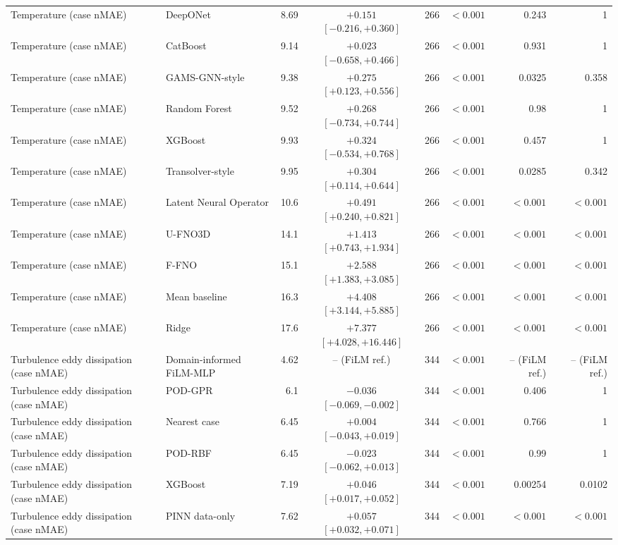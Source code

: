 \begin{landscape}
\begin{longtable}{p{4.0cm}p{3.4cm}rcrrrr}
Temperature (case nMAE) & DeepONet & 8.69 & $+0.151$ $[-0.216, +0.360]$ & 266 & $< 0.001$ & 0.243 & 1 \\
Temperature (case nMAE) & CatBoost & 9.14 & $+0.023$ $[-0.658, +0.466]$ & 266 & $< 0.001$ & 0.931 & 1 \\
Temperature (case nMAE) & GAMS-GNN-style & 9.38 & $+0.275$ $[+0.123, +0.556]$ & 266 & $< 0.001$ & 0.0325 & 0.358 \\
Temperature (case nMAE) & Random Forest & 9.52 & $+0.268$ $[-0.734, +0.744]$ & 266 & $< 0.001$ & 0.98 & 1 \\
Temperature (case nMAE) & XGBoost & 9.93 & $+0.324$ $[-0.534, +0.768]$ & 266 & $< 0.001$ & 0.457 & 1 \\
Temperature (case nMAE) & Transolver-style & 9.95 & $+0.304$ $[+0.114, +0.644]$ & 266 & $< 0.001$ & 0.0285 & 0.342 \\
Temperature (case nMAE) & Latent Neural Operator & 10.6 & $+0.491$ $[+0.240, +0.821]$ & 266 & $< 0.001$ & $< 0.001$ & $< 0.001$ \\
Temperature (case nMAE) & U-FNO3D & 14.1 & $+1.413$ $[+0.743, +1.934]$ & 266 & $< 0.001$ & $< 0.001$ & $< 0.001$ \\
Temperature (case nMAE) & F-FNO & 15.1 & $+2.588$ $[+1.383, +3.085]$ & 266 & $< 0.001$ & $< 0.001$ & $< 0.001$ \\
Temperature (case nMAE) & Mean baseline & 16.3 & $+4.408$ $[+3.144, +5.885]$ & 266 & $< 0.001$ & $< 0.001$ & $< 0.001$ \\
Temperature (case nMAE) & Ridge & 17.6 & $+7.377$ $[+4.028, +16.446]$ & 266 & $< 0.001$ & $< 0.001$ & $< 0.001$ \\
Turbulence eddy dissipation (case nMAE) & Domain-informed FiLM-MLP & 4.62 & -- (FiLM ref.) & 344 & $< 0.001$ & -- (FiLM ref.) & -- (FiLM ref.) \\
Turbulence eddy dissipation (case nMAE) & POD-GPR & 6.1 & $-0.036$ $[-0.069, -0.002]$ & 344 & $< 0.001$ & 0.406 & 1 \\
Turbulence eddy dissipation (case nMAE) & Nearest case & 6.45 & $+0.004$ $[-0.043, +0.019]$ & 344 & $< 0.001$ & 0.766 & 1 \\
Turbulence eddy dissipation (case nMAE) & POD-RBF & 6.45 & $-0.023$ $[-0.062, +0.013]$ & 344 & $< 0.001$ & 0.99 & 1 \\
Turbulence eddy dissipation (case nMAE) & XGBoost & 7.19 & $+0.046$ $[+0.017, +0.052]$ & 344 & $< 0.001$ & 0.00254 & 0.0102 \\
Turbulence eddy dissipation (case nMAE) & PINN data-only & 7.62 & $+0.057$ $[+0.032, +0.071]$ & 344 & $< 0.001$ & $< 0.001$ & $< 0.001$ \\

\end{longtable}
\end{landscape}
